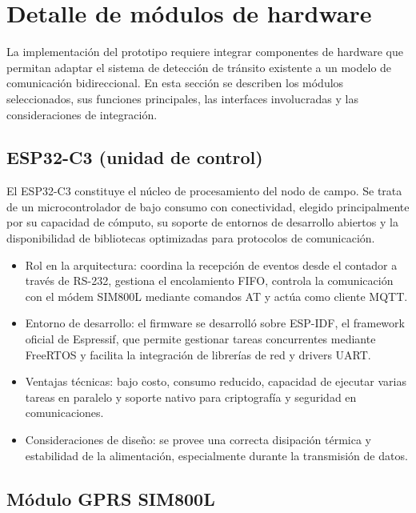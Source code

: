 \section{Detalle de módulos de hardware}
La implementación del prototipo requiere integrar componentes de hardware que permitan adaptar el sistema de detección de tránsito existente a un modelo de comunicación bidireccional. En esta sección se describen los módulos seleccionados, sus funciones principales, las interfaces involucradas y las consideraciones de integración.


\subsection{ESP32-C3 (unidad de control)}
El ESP32-C3 constituye el núcleo de procesamiento del nodo de campo. Se trata de un microcontrolador de bajo consumo con conectividad, elegido principalmente por su capacidad de cómputo, su soporte de entornos de desarrollo abiertos y la disponibilidad de bibliotecas optimizadas para protocolos de comunicación.

\begin{itemize}

\item Rol en la arquitectura: coordina la recepción de eventos desde el contador a través de RS-232, gestiona el encolamiento FIFO, controla la comunicación con el módem SIM800L mediante comandos AT y actúa como cliente MQTT.

\item Entorno de desarrollo: el firmware se desarrolló sobre ESP-IDF, el framework oficial de Espressif, que permite gestionar tareas concurrentes mediante FreeRTOS y facilita la integración de librerías de red y drivers UART.

\item Ventajas técnicas: bajo costo, consumo reducido, capacidad de ejecutar varias tareas en paralelo y soporte nativo para criptografía y seguridad en comunicaciones.

\item Consideraciones de diseño: se provee una correcta disipación térmica y  estabilidad de la alimentación, especialmente durante la transmisión de datos.

\end{itemize}

\subsection{Módulo GPRS SIM800L}

